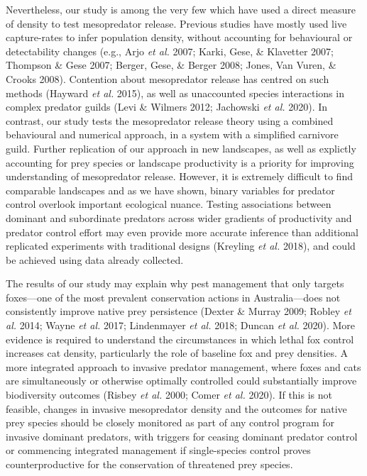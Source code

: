 \documentclass[11pt,a4paper,titlepage,twoside,openright]{style/unimelbthesis}
\begin{document}
\begin{mainmatter}
Nevertheless, our study is among the very few which have used a direct measure of density to test mesopredator release. Previous studies have mostly used live capture-rates to infer population density, without accounting for behavioural or detectability changes (e.g., Arjo \emph{et al.} 2007; Karki, Gese, \& Klavetter 2007; Thompson \& Gese 2007; Berger, Gese, \& Berger 2008; Jones, Van Vuren, \& Crooks 2008). Contention about mesopredator release has centred on such methods (Hayward \emph{et al.} 2015), as well as unaccounted species interactions in complex predator guilds (Levi \& Wilmers 2012; Jachowski \emph{et al.} 2020). In contrast, our study tests the mesopredator release theory using a combined behavioural and numerical approach, in a system with a simplified carnivore guild. Further replication of our approach in new landscapes, as well as explictly accounting for prey species or landscape productivity is a priority for improving understanding of mesopredator release. However, it is extremely difficult to find comparable landscapes and as we have shown, binary variables for predator control overlook important ecological nuance. Testing associations between dominant and subordinate predators across wider gradients of productivity and predator control effort may even provide more accurate inference than additional replicated experiments with traditional designs (Kreyling \emph{et al.} 2018), and could be achieved using data already collected.

The results of our study may explain why pest management that only targets foxes---one of the most prevalent conservation actions in Australia---does not consistently improve native prey persistence (Dexter \& Murray 2009; Robley \emph{et al.} 2014; Wayne \emph{et al.} 2017; Lindenmayer \emph{et al.} 2018; Duncan \emph{et al.} 2020). More evidence is required to understand the circumstances in which lethal fox control increases cat density, particularly the role of baseline fox and prey densities. A more integrated approach to invasive predator management, where foxes and cats are simultaneously or otherwise optimally controlled could substantially improve biodiversity outcomes (Risbey \emph{et al.} 2000; Comer \emph{et al.} 2020). If this is not feasible, changes in invasive mesopredator density and the outcomes for native prey species should be closely monitored as part of any control program for invasive dominant predators, with triggers for ceasing dominant predator control or commencing integrated management if single-species control proves counterproductive for the conservation of threatened prey species.


\end{mainmatter}
\end{document}
